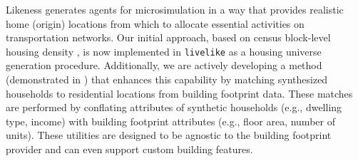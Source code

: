 Likeness generates agents for microsimulation in a way that provides realistic home (origin) locations from which to allocate essential activities on transportation networks. Our initial approach, based on census block-level housing density \cite{likeness-scipy-paper-2022, likeness-scipy-poster-2022}, is now implemented in \texttt{livelike} as a housing universe generation procedure. Additionally, we are actively developing a method (demonstrated in ) that enhances this capability by matching synthesized households to residential locations from building footprint data.  These matches are performed by conflating attributes of synthetic households (e.g., dwelling type, income) with building footprint attributes (e.g., floor area, number of units). These utilities are designed to be agnostic to the building footprint provider and can even support
custom building features.



